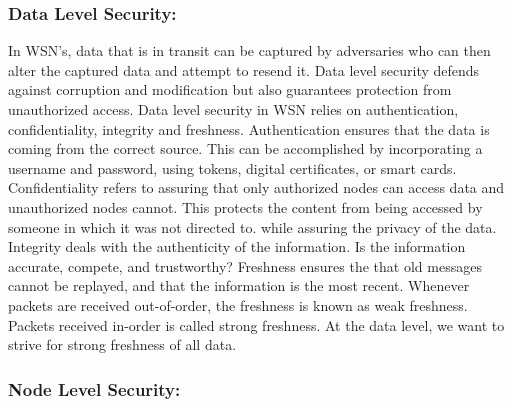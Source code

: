 \subsubsection {Data Level Security:}


In WSN’s, data that is in transit can be captured by adversaries who can then alter the captured data and attempt to resend it. Data level security defends against corruption and modification but also guarantees protection from unauthorized access. Data level security in WSN relies on authentication, confidentiality, integrity and freshness. Authentication ensures that the data is coming from the correct source. This can be accomplished by incorporating a username and password, using tokens, digital certificates, or smart cards. Confidentiality refers to assuring that only authorized nodes can access data and unauthorized nodes cannot. This protects the content from being accessed by someone in which it was not directed to. while assuring the privacy of the data. Integrity deals with the authenticity of the information. Is the information accurate, compete, and trustworthy? Freshness ensures the that old messages cannot be replayed, and that the information is the most recent. Whenever packets are received out-of-order, the freshness is known as weak freshness. Packets received in-order is called strong freshness. At the data level, we want to strive for strong freshness of all data. 

\subsubsection {Node Level Security:}


